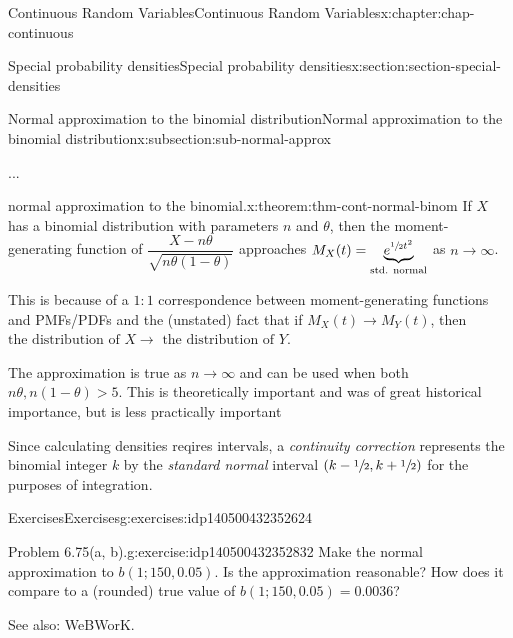 \documentclass[oneside,10pt,]{book}
\newcommand{\gt}{>}
\begin{document}
\begin{chapterptx}{Continuous Random Variables}{}{Continuous Random Variables}{}{}{x:chapter:chap-continuous}
\begin{sectionptx}{Special probability densities}{}{Special probability densities}{}{}{x:section:section-special-densities}
%
%
\typeout{************************************************}
\typeout{************************************************}
%
\begin{subsectionptx}{Normal approximation to the binomial distribution}{}{Normal approximation to the binomial distribution}{}{}{x:subsection:sub-normal-approx}
\begin{introduction}{}%
...%
\end{introduction}%
\begin{theorem}{normal approximation to the binomial.}{}{x:theorem:thm-cont-normal-binom}%
If \(X\) has a binomial distribution with parameters \(n\) and \(\theta\), then the moment-generating function of \(\dfrac{X-n\theta}{\sqrt{n\theta(1-\theta)}}\) approaches \(M_X(t) =
\underbrace{e^{\sfrac{1}{2}t^2}}_{\text{std. normal}}\) as \(n\to\infty\).%
\end{theorem}
This is because of a \(1:1\) correspondence between moment-generating functions and PMFs\slash{}PDFs and the (unstated) fact that if \(M_X(t) \to M_Y(t)\), then \(\text{the distribution of }X
\to\text{ the distribution of }Y\).%
\par
The approximation is true as \(n\to\infty\) and can be used when both \(n\theta, n(1-\theta) \gt 5\).  This is theoretically important and was of great historical importance, but is less practically important%
\par
Since calculating densities reqires intervals, a \emph{continuity correction} represents the binomial integer \(k\) by the \emph{standard normal} interval \((k-\sfrac{1}{2},
k+\sfrac{1}{2})\) for the purposes of integration.%
%
%
\typeout{************************************************}
\typeout{************************************************}
%
\begin{exercises-subsubsection}{Exercises}{}{Exercises}{}{}{g:exercises:idp140500432352624}
\begin{divisionexercise}{1}{Problem 6.75(a, b).}{}{g:exercise:idp140500432352832}%
Make the normal approximation to \(b(1; 150, 0.05)\). Is the approximation reasonable? How does it compare to a (rounded) true value of \(b(1;
150, 0.05) = 0.0036\)?%
\end{divisionexercise}%
See also: WeBWorK.%
\end{exercises-subsubsection}
\end{subsectionptx}
\end{sectionptx}
%
%
\typeout{************************************************}

\end{chapterptx}
\end{document}
